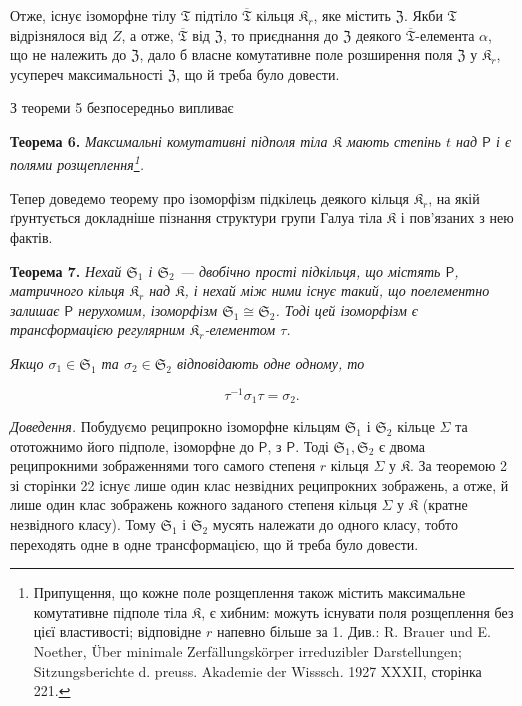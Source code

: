 \documentclass[11pt]{article}
\newcommand{\srcfn}[2]{\footnote{#2}}
\begin{document}
Отже, існує ізоморфне тілу \(\mathfrak T\) підтіло \(\overline{\mathfrak T}\) кільця \(\mathfrak K_r\), яке містить \(\mathfrak Z\). Якби \(\mathfrak T\) відрізнялося від \(Z\), а отже, \(\overline{\mathfrak T}\) від \(\mathfrak Z\), то приєднання до \(\mathfrak Z\) деякого \(\overline{\mathfrak T}\)-елемента \(\alpha\), що не належить до \(\mathfrak Z\), дало б власне комутативне поле розширення поля \(\mathfrak Z\) у \(\mathfrak K_r\), усупереч максимальності \(\mathfrak Z\), що й треба було довести.

З теореми 5 безпосередньо випливає

\textbf{Теорема 6.} \emph{Максимальні комутативні підполя тіла \(\mathfrak K\) мають степінь \(t\) над \(\mathsf P\) і є полями розщеплення\srcfn{1}{Припущення, що кожне поле розщеплення також містить максимальне комутативне підполе тіла \(\mathfrak K\), є хибним: можуть існувати поля розщеплення без цієї властивості; відповідне \(r\) напевно більше за 1. Див.: R. Brauer und E. Noether, Über minimale Zerfällungskörper irreduzibler Darstellungen; Sitzungsberichte d. preuss. Akademie der Wisssch. 1927 XXXII, сторінка 221.}.}

Тепер доведемо теорему про ізоморфізм підкілець деякого кільця \(\mathfrak K_r\), на якій ґрунтується докладніше пізнання структури групи Галуа тіла \(\mathfrak K\) і пов'язаних з нею фактів.

\textbf{Теорема 7.} \emph{Нехай \(\mathfrak S_1\) і \(\mathfrak S_2\) --- двобічно прості підкільця, що містять \(\mathsf P\), матричного кільця \(\mathfrak K_r\) над \(\mathfrak K\), і нехай між ними існує такий, що поелементно залишає \(\mathsf P\) нерухомим, ізоморфізм \(\mathfrak S_1\cong\mathfrak S_2\). Тоді цей ізоморфізм є трансформацією регулярним \(\mathfrak K_r\)-елементом \(\tau\).}

\emph{Якщо \(\sigma_1\in\mathfrak S_1\) та \(\sigma_2\in\mathfrak S_2\) відповідають одне одному, то}

\[
\tau^{-1}\sigma_1\tau=\sigma_2.
\]

\emph{Доведення.} Побудуємо реципрокно ізоморфне кільцям \(\mathfrak S_1\) і \(\mathfrak S_2\) кільце \(\Sigma\) та ототожнимо його підполе, ізоморфне до \(\mathsf P\), з \(\mathsf P\). Тоді \(\mathfrak S_1,\mathfrak S_2\) є двома реципрокними зображеннями того самого степеня \(r\) кільця \(\Sigma\) у \(\mathfrak K\). За теоремою 2 зі сторінки 22 існує лише один клас незвідних реципрокних зображень, а отже, й лише один клас зображень кожного заданого степеня кільця \(\Sigma\) у \(\mathfrak K\) (кратне незвідного класу). Тому \(\mathfrak S_1\) і \(\mathfrak S_2\) мусять належати до одного класу, тобто переходять одне в одне трансформацією, що й треба було довести.
\end{document}

